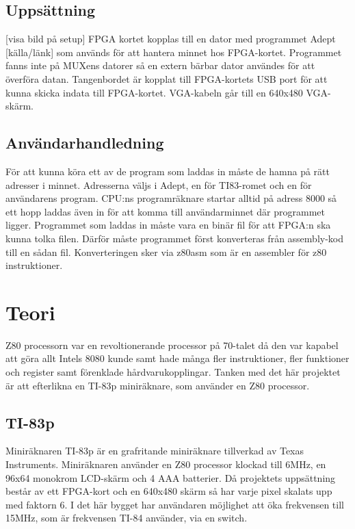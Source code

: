 \documentclass{article}
\begin{document}
\subsection{Uppsättning}
[visa bild på setup] FPGA kortet kopplas till en dator med programmet Adept [källa/länk] som används för att hantera minnet hos FPGA-kortet. Programmet fanns inte på MUXens datorer så en extern bärbar dator användes för att överföra datan. Tangenbordet är kopplat till FPGA-kortets USB port för att kunna skicka indata till FPGA-kortet. VGA-kabeln går till en 640x480 VGA-skärm.

\subsection{Användarhandledning}
För att kunna köra ett av de program som laddas in måste de hamna på rätt adresser i minnet. Adresserna väljs i Adept, en för TI83-romet och en för användarens program. CPU:ns programräknare startar alltid på adress 8000 så ett hopp laddas även in för att komma till användarminnet där programmet ligger. Programmet som laddas in måste vara en binär fil för att FPGA:n ska kunna tolka filen. Därför måste programmet först konverteras från assembly-kod till en sådan fil. Konverteringen sker via z80asm som är en assembler för z80 instruktioner.

\clearpage
\section{Teori}
Z80 processorn var en revoltionerande processor på 70-talet då den var kapabel att göra allt Intels 8080 kunde samt hade många fler instruktioner, fler funktioner och register samt förenklade hårdvarukopplingar. Tanken med det här projektet är att efterlikna en TI-83p miniräknare, som använder en Z80 processor.
\subsection{TI-83p}
Miniräknaren TI-83p är en grafritande miniräknare tillverkad av Texas Instruments. Miniräknaren använder en Z80 processor klockad till 6MHz, en 96x64 monokrom LCD-skärm och 4 AAA batterier. Då projektets uppsättning består av ett FPGA-kort och en 640x480 skärm så har varje pixel skalats upp med faktorn 6. I det här bygget har användaren möjlighet att öka frekvensen till 15MHz, som är frekvensen TI-84 använder, via en switch.
\end{document}
